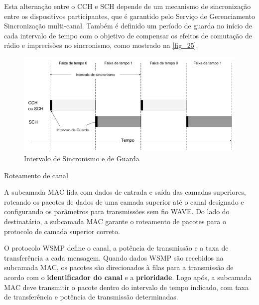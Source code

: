 \documentclass[
12pt,				%
openright,			%
oneside,			%
a4paper,			%
brazil,				%
]{abntex2}
\begin{document}
	\par Esta alternação entre o CCH e SCH depende de um mecanismo de sincronização entre os dispositivos participantes, que é garantido pelo Serviço de Gerenciamento Sincronização multi-canal. Também é definido um período de guarda no início de cada intervalo de tempo com o objetivo de compensar os efeitos de comutação de rádio e imprecisões no sincronismo, como mostrado na \autoref{fig_25}.
	
	\begin{figure} [H]
		\centering
		\includegraphics[scale=.5]{figuras/cap3/25IntervaloDeSincronismoEDeGuarda}
		\caption{\label{fig_25}Intervalo de Sincronismo e de Guarda}
	\end{figure}
	
	\begin{description}
        \item[Roteamento de canal]
    \end{description}
	
	\par A subcamada MAC lida com dados de entrada e saída das camadas superiores, roteando os pacotes de dados de uma camada superior até o canal designado e configurando os parâmetros para transmissões sem fio WAVE. Do lado do destinatário, a subcamada MAC garante o roteamento de pacotes para o protocolo de camada superior correto.
	
	\par O protocolo WSMP define o canal, a potência de transmissão e a taxa de transferência a cada mensagem. Quando dados WSMP são recebidos na subcamada MAC, os pacotes são direcionados à filas para a transmissão de acordo com o \textbf{identificador do canal} e a \textbf{prioridade}. Logo após, a subcamada MAC deve transmitir o pacote dentro do intervalo de tempo indicado, com taxa de transferência e potência de transmissão determinadas.
	
\end{document}
